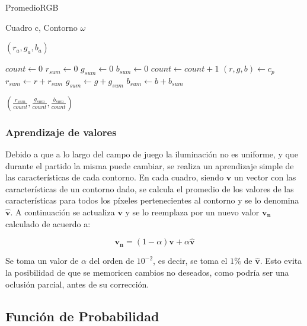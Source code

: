 \begin{algorithm}
    \caption{PromedioRGB}
    \label{alg:carac-rgb}
    \begin{algorithmic}
    \Require\hspace{\algorithmicindent}\hspace{\algorithmicindent}Cuadro c, Contorno $\omega$

    \Ensure\hspace{\algorithmicindent}\hspace{0.23cm} $(r_a, g_a, b_a)$
    \State

    \State $count \gets 0$
    \State $r_{sum} \gets 0$
    \State $g_{sum} \gets 0$
    \State $b_{sum} \gets 0$
        \State $count \gets count + 1$
        \State $(r, g, b) \gets c_{p}$
        \State $r_{sum} \gets r + r_{sum}$
        \State $g_{sum} \gets g + g_{sum}$
        \State $b_{sum} \gets b + b_{sum}$
    \EndFor

    \State \Return $ (\frac{r_{sum}}{count}, \frac{g_{sum}}{count}, \frac{b_{sum}}{count}) $
    \end{algorithmic}
\end{algorithm}


\subsubsection{Aprendizaje de valores}

Debido a que a lo largo del campo de juego la iluminación no es uniforme, y que
durante el partido la misma puede cambiar, se realiza un aprendizaje simple
de las características de cada contorno. En cada cuadro, siendo $\mathbf{v}$ un
vector con las características de un contorno dado, se calcula el promedio de
los valores de las características para todos los píxeles pertenecientes al
contorno y se lo denomina $\hat{\mathbf{v}}$. A continuación se actualiza
$\mathbf{v}$ y se lo reemplaza por un nuevo valor $\mathbf{v_n}$ calculado de
acuerdo a:

\[
  \mathbf{v_n} = \left(1-\alpha\right)\mathbf{v} + \alpha \hat{\mathbf{v}}
\]

Se toma un valor de $\alpha$ del orden de $10^{-2}$, es decir, se toma el $1\%$
de $\hat{\mathbf{v}}$. Esto evita la posibilidad de que se memoricen cambios
no deseados, como podría ser una oclusión parcial, antes de su corrección.

\subsection{Función de Probabilidad}

